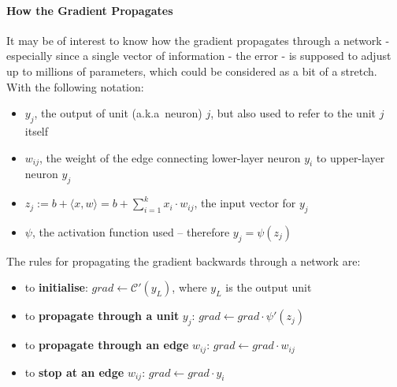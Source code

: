 \documentclass[a4paper,11pt]{article}
\begin{document}
\paragraph{How the Gradient Propagates}

It may be of interest to know how the gradient propagates through a network - especially since a single vector of information - the error - is supposed to adjust up to millions of parameters, which could be considered as a bit of a stretch.\\

With the following notation:
\begin{itemize}
\renewcommand\labelitemi{--}
\item $y_{j}$, the output of unit (a.k.a\ neuron) $j$, but also used to refer to the unit $j$ itself
\item $w_{ij}$, the weight of the edge connecting lower-layer neuron $y_{i}$ to upper-layer neuron $y_{j}$
\item $z_{j} := b+ \langle x,w \rangle = b + \sum\limits_{i=1}^k x_{i}\cdot w_{ij}$, the input vector for $y_{j}$
\item $\psi$, the activation function used -- therefore $y_{j} = \psi(z_{j})$ \\
\end{itemize}

The rules for propagating the gradient backwards through a network are:
\begin{itemize}
\renewcommand\labelitemi{--}
\item to \textbf{initialise}: $grad \leftarrow \mathcal{C}'(y_{L})$, where $y_{L}$ is the output unit
\item to \textbf{propagate through a unit} $y_{j}$: $grad \leftarrow grad \cdot \psi'(z_{j})$
\item to \textbf{propagate through an edge} $w_{ij}$: $grad \leftarrow grad \cdot w_{ij}$
\item to \textbf{stop at an edge} $w_{ij}$: $grad \leftarrow grad \cdot y_{i}$ \\
\end{itemize}
\end{document}
